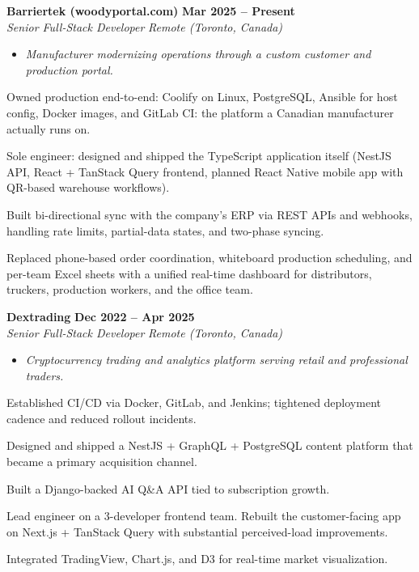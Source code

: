 \documentclass[letterpaper,10pt]{article}
\newcommand{\heading}[2]{
  \hspace{10pt}#1\hfill#2\\
}
\newcommand{\headingBf}[2]{
  \heading{\textbf{#1}}{\textbf{#2}}
}
\newcommand{\headingIt}[2]{
  \heading{\textit{#1}}{\textit{#2}}
}
\newenvironment{resume_list}{
  \vspace{-7pt}
  \begin{itemize}[itemsep=-2px, parsep=1pt, leftmargin=30pt]
}{
  \end{itemize}
  \vspace{2pt}
}
\newcommand{\companyDescription}[1]{
  \vspace{-7pt}
  \begin{itemize}[itemsep=-2px, parsep=1pt, leftmargin=12pt]
    \item[] {\color{textMuted}\textit{#1}}
  \end{itemize}
  \vspace{-4pt}
}
\begin{document}
  \headingBf{ Barriertek (woodyportal.com) }{ Mar 2025 -- Present }
  \headingIt{ Senior Full-Stack Developer }{ Remote (Toronto, Canada) }
  \companyDescription{ Manufacturer modernizing operations through a custom customer and production portal. }
  \begin{resume_list}
    \item Owned production end-to-end: Coolify on Linux, PostgreSQL, Ansible for host config, Docker images, and GitLab CI: the platform a Canadian manufacturer actually runs on.
    \item Sole engineer: designed and shipped the TypeScript application itself (NestJS API, React + TanStack Query frontend, planned React Native mobile app with QR-based warehouse workflows).
    \item Built bi-directional sync with the company's ERP via REST APIs and webhooks, handling rate limits, partial-data states, and two-phase syncing.
    \item Replaced phone-based order coordination, whiteboard production scheduling, and per-team Excel sheets with a unified real-time dashboard for distributors, truckers, production workers, and the office team.
  \end{resume_list}

  \headingBf{ Dextrading }{ Dec 2022 -- Apr 2025 }
  \headingIt{ Senior Full-Stack Developer }{ Remote (Toronto, Canada) }
  \companyDescription{ Cryptocurrency trading and analytics platform serving retail and professional traders. }
  \begin{resume_list}
    \item Established CI/CD via Docker, GitLab, and Jenkins; tightened deployment cadence and reduced rollout incidents.
    \item Designed and shipped a NestJS + GraphQL + PostgreSQL content platform that became a primary acquisition channel.
    \item Built a Django-backed AI Q\&A API tied to subscription growth.
    \item Lead engineer on a 3-developer frontend team. Rebuilt the customer-facing app on Next.js + TanStack Query with substantial perceived-load improvements.
    \item Integrated TradingView, Chart.js, and D3 for real-time market visualization.
  \end{resume_list}
\end{document}
